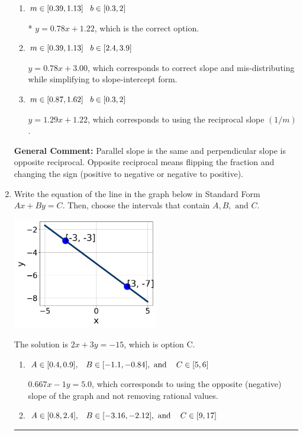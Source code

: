 \documentclass{extbook}[14pt]
\newcommand{\litem}[1]{\item #1

\rule{\textwidth}{0.4pt}}
\begin{document}
\begin{enumerate}
{\begin{enumerate}[label=\Alph*.]
 $y = -0.78x - 11.22$, which corresponds to using the negative slope.
\item \( m \in [0.39, 1.13] \hspace*{3mm} b \in [0.3, 2] \)

* $y = 0.78x + 1.22$, which is the correct option.
\item \( m \in [0.39, 1.13] \hspace*{3mm} b \in [2.4, 3.9] \)

 $y = 0.78x + 3.00$, which corresponds to correct slope and mis-distributing while simplifying to slope-intercept form.
\item \( m \in [0.87, 1.62] \hspace*{3mm} b \in [0.3, 2] \)

 $y = 1.29x + 1.22$, which corresponds to using the reciprocal slope $(1/m)$.
\end{enumerate}

\textbf{General Comment:} Parallel slope is the same and perpendicular slope is opposite reciprocal. Opposite reciprocal means flipping the fraction and changing the sign (positive to negative or negative to positive).
}
\litem{
Write the equation of the line in the graph below in Standard Form $Ax+By=C$. Then, choose the intervals that contain $A, B, \text{ and } C$.

\begin{center}
    \includegraphics[width=0.5\textwidth]{../Figures/linearGraphToStandardCopyC.png}
\end{center}


The solution is \( 2x + 3y = -15 \), which is option C.\begin{enumerate}[label=\Alph*.]
\item \( A \in [0.4, 0.9], \hspace{3mm} B \in [-1.1, -0.84], \text{ and } \hspace{3mm} C \in [5, 6] \)

 $0.667x - 1y = 5.0$, which corresponds to using the opposite (negative) slope of the graph and not removing rational values.
\item \( A \in [0.8, 2.4], \hspace{3mm} B \in [-3.16, -2.12], \text{ and } \hspace{3mm} C \in [9, 17] \)


\end{enumerate}}
\end{enumerate}
\end{document}
